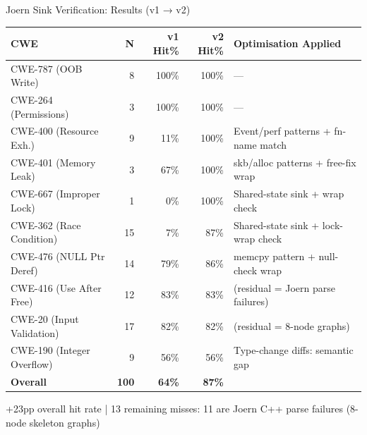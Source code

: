 \documentclass[aspectratio=169,10pt]{beamer}
\newcommand{\chit}[1]{\cellcolor{hit!30} #1}
\newcommand{\cmiss}[1]{\cellcolor{miss!25} #1}
\newcommand{\cwarn}[1]{\cellcolor{warn!30} #1}
\begin{document}
\begin{frame}{Joern Sink Verification: Results (v1 → v2)}

  \centering
  \vspace{0.1em}
  {\scriptsize
  \renewcommand{\arraystretch}{1.3}
  \setlength{\tabcolsep}{4pt}
  \begin{tabular}{l r r r l}
    \toprule
    \textbf{CWE} & \textbf{N} & \textbf{v1 Hit\%} & \textbf{v2 Hit\%} & \textbf{Optimisation Applied} \\
    \midrule
    CWE-787 (OOB Write)       & 8  & \chit{100\%} & \chit{100\%} & — \\
    CWE-264 (Permissions)     & 3  & \chit{100\%} & \chit{100\%} & — \\
    CWE-400 (Resource Exh.)   & 9  & \cmiss{11\%} & \chit{100\%} & Event/perf patterns + fn-name match \\
    CWE-401 (Memory Leak)     & 3  & \cwarn{67\%} & \chit{100\%} & skb/alloc patterns + free-fix wrap \\
    CWE-667 (Improper Lock)   & 1  & \cmiss{0\%}  & \chit{100\%} & Shared-state sink + wrap check \\
    \rowcolor{c1!8}
    CWE-362 (Race Condition)  & 15 & \cmiss{7\%}  & \chit{87\%}  & Shared-state sink + lock-wrap check \\
    CWE-476 (NULL Ptr Deref)  & 14 & 79\%         & \chit{86\%}  & memcpy pattern + null-check wrap \\
    CWE-416 (Use After Free)  & 12 & \chit{83\%}  & \chit{83\%}  & (residual = Joern parse failures) \\
    CWE-20 (Input Validation) & 17 & \chit{82\%}  & \chit{82\%}  & (residual = 8-node graphs) \\
    CWE-190 (Integer Overflow) & 9 & \cwarn{56\%} & \cwarn{56\%} & Type-change diffs: semantic gap \\
    \midrule
    \textbf{Overall}          & \textbf{100} & \textbf{64\%} & \textbf{87\%} & \\
    \bottomrule
  \end{tabular}}

  \vspace{0.5em}
  {\scriptsize
  \textcolor{hit}{} +23pp overall hit rate \quad|\quad
  \textcolor{c1}{} 13 remaining misses: 11 are Joern C++ parse failures (8-node skeleton graphs)}

\end{frame}
\end{document}
